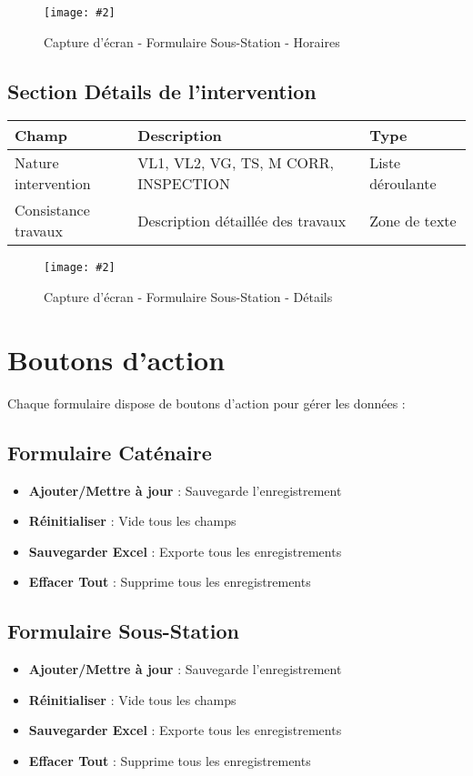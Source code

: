 \documentclass[12pt,a4paper]{report}
\newcommand{\screenshot}[3][]{%
\begin{figure}[H]
\centering
\texttt{[image: \#2]}
\caption{#3}
\end{figure}
}
\begin{document}
\screenshot{ss_horaire.png}{Capture d'écran - Formulaire Sous-Station - Horaires}

\subsection{Section Détails de l'intervention}

\begin{table}[H]
\centering
\begin{tabular}{|p{3cm}|p{8cm}|p{3cm}|}
\hline
\textbf{Champ} & \textbf{Description} & \textbf{Type} \\
\hline
Nature intervention & VL1, VL2, VG, TS, M CORR, INSPECTION & Liste déroulante \\
\hline
Consistance travaux & Description détaillée des travaux & Zone de texte \\
\hline
\end{tabular}
\end{table}

\screenshot{ss_travaux.png}{Capture d'écran - Formulaire Sous-Station - Détails}

\section{Boutons d'action}

Chaque formulaire dispose de boutons d'action pour gérer les données :

\subsection{Formulaire Caténaire}
\begin{itemize}
    \item \textbf{Ajouter/Mettre à jour} : Sauvegarde l'enregistrement
    \item \textbf{Réinitialiser} : Vide tous les champs
    \item \textbf{Sauvegarder Excel} : Exporte tous les enregistrements
    \item \textbf{Effacer Tout} : Supprime tous les enregistrements
\end{itemize}

\subsection{Formulaire Sous-Station}
\begin{itemize}
    \item \textbf{Ajouter/Mettre à jour} : Sauvegarde l'enregistrement
    \item \textbf{Réinitialiser} : Vide tous les champs
    \item \textbf{Sauvegarder Excel} : Exporte tous les enregistrements
    \item \textbf{Effacer Tout} : Supprime tous les enregistrements
\end{itemize}
\end{document}

